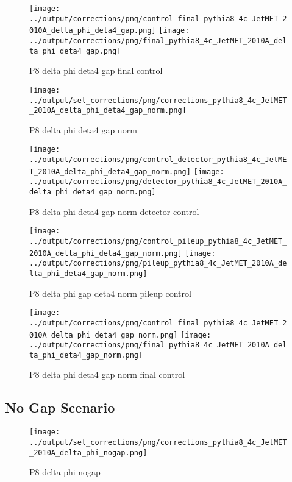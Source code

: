 \documentclass[11pt]{book}
\begin{document}
\begin{figure}[ht]
\centering
\texttt{[image: ../output/corrections/png/control\_final\_pythia8\_4c\_JetMET\_2010A\_delta\_phi\_deta4\_gap.png]}
\texttt{[image: ../output/corrections/png/final\_pythia8\_4c\_JetMET\_2010A\_delta\_phi\_deta4\_gap.png]}
\caption{P8 delta phi deta4 gap final control}
\label{fig:p8_JetMET_2010A_delta_phi_deta4_gap_final_control}
\end{figure}


\begin{figure}[ht]
\centering
\texttt{[image: ../output/sel\_corrections/png/corrections\_pythia8\_4c\_JetMET\_2010A\_delta\_phi\_deta4\_gap\_norm.png]}
\caption{P8 delta phi deta4 gap norm}
\label{fig:p8_JetMET_2010A_delta_phi_deta4_gap_norm}
\end{figure}


\begin{figure}[ht]
\centering
\texttt{[image: ../output/corrections/png/control\_detector\_pythia8\_4c\_JetMET\_2010A\_delta\_phi\_deta4\_gap\_norm.png]}
\texttt{[image: ../output/corrections/png/detector\_pythia8\_4c\_JetMET\_2010A\_delta\_phi\_deta4\_gap\_norm.png]}
\caption{P8 delta phi deta4 gap norm detector control}
\label{fig:p8_JetMET_2010A_delta_phi_deta4_gap_norm_detector_control}
\end{figure}

\begin{figure}[ht]
\centering
\texttt{[image: ../output/corrections/png/control\_pileup\_pythia8\_4c\_JetMET\_2010A\_delta\_phi\_deta4\_gap\_norm.png]}
\texttt{[image: ../output/corrections/png/pileup\_pythia8\_4c\_JetMET\_2010A\_delta\_phi\_deta4\_gap\_norm.png]}
\caption{P8 delta phi gap deta4 norm pileup control}
\label{fig:p8_JetMET_2010A_delta_phi_deta4_gap_norm_pileup_control}
\end{figure}


\begin{figure}[ht]
\centering
\texttt{[image: ../output/corrections/png/control\_final\_pythia8\_4c\_JetMET\_2010A\_delta\_phi\_deta4\_gap\_norm.png]}
\texttt{[image: ../output/corrections/png/final\_pythia8\_4c\_JetMET\_2010A\_delta\_phi\_deta4\_gap\_norm.png]}
\caption{P8 delta phi deta4 gap norm final control}
\label{fig:p8_JetMET_2010A_delta_phi_deta4_gap_norm_final_control}
\end{figure}

\clearpage
\subsection{No Gap Scenario}
\begin{figure}[ht]
\centering
\texttt{[image: ../output/sel\_corrections/png/corrections\_pythia8\_4c\_JetMET\_2010A\_delta\_phi\_nogap.png]}
\caption{P8 delta phi nogap}
\label{fig:p8_JetMET_2010A_delta_phi_nogap}
\end{figure}
\end{document}
